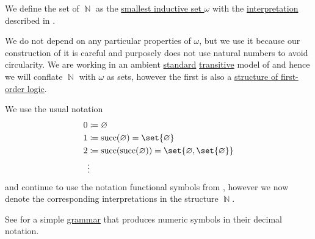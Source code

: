 \begin{definition}\label{def:set_of_natural_numbers}
  We define the set of  \( \BbbN \) as the \hyperref[thm:smallest_inductive_set_existence]{smallest inductive set \( \omega \)} with the \hyperref[def:first_order_structure/interpretation]{interpretation} described in .

  We do not depend on any particular properties of \( \omega \), but we use it because our construction of it is careful and purposely does not use natural numbers to avoid circularity. We are working in an ambient \hyperref[rem:standard_model_of_set_theory]{standard} \hyperref[rem:transitive_model_of_set_theory]{transitive} model of \hyperref[def:axiom_of_universes]{} and hence we will conflate \( \BbbN \) with \( \omega \) as sets, however the first is also a \hyperref[def:first_order_structure]{structure of first-order logic}.

  We use the usual notation
  \begin{align*}
    0 &\coloneqq \varnothing \\
    1 &\coloneqq \op{succ}(\varnothing) = \set{ \varnothing } \\
    2 &\coloneqq \op{succ}(\op{succ}(\varnothing)) = \set{ \varnothing, \set{ \varnothing } } \\
      &\vdots
  \end{align*}
  and continue to use the notation functional symbols from , however we now denote the corresponding interpretations in the structure \( \BbbN \).

  See  for a simple \hyperref[def:grammar]{grammar} that produces numeric symbols in their decimal notation.
\end{definition}


